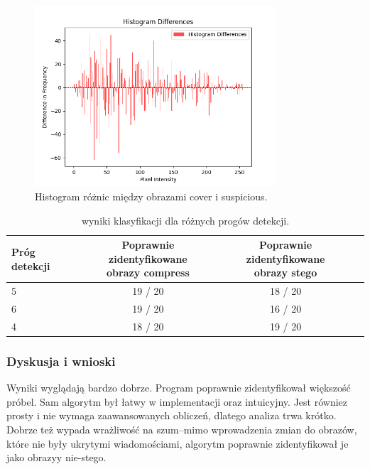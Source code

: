 \begin{figure}[h!]
    \centering
    \includegraphics[width=0.8\textwidth]{./img/diff_histogram.png}
    \caption{Histogram różnic między obrazami cover i suspicious.}
    \label{fig:histogram_diff}
\end{figure}

\begin{table}[h!]
    \centering
    \begin{tabular}{@{}lccc@{}}
    \toprule
    \textbf{Próg detekcji} & \textbf{Poprawnie zidentyfikowane\\obrazy compress} & \textbf{Poprawnie zidentyfikowane\\obrazy stego} \\ \midrule
    5 & 19 / 20 & 18 / 20 \\
    6 & 19 / 20 & 16 / 20 \\
    4 & 18 / 20 & 19 / 20 \\ \bottomrule
    \end{tabular}
    \caption{wyniki klasyfikacji dla różnych progów detekcji.}
    \label{tab:classification_results}
    \end{table}

\subsubsection{Dyskusja i wnioski} 
Wyniki wyglądają bardzo dobrze. Program poprawnie zidentyfikował większość próbel. Sam algorytm był łatwy w 
implementacji oraz intuicyjny. Jest równiez prosty i nie wymaga zaawansowanych obliczeń, dlatego analiza trwa 
krótko.
Dobrze też wypada wrażliwość na szum--mimo wprowadzenia zmian do obrazów, które nie były ukrytymi 
wiadomościami, algorytm poprawnie zidentyfikował je jako obrazyy nie-stego.


